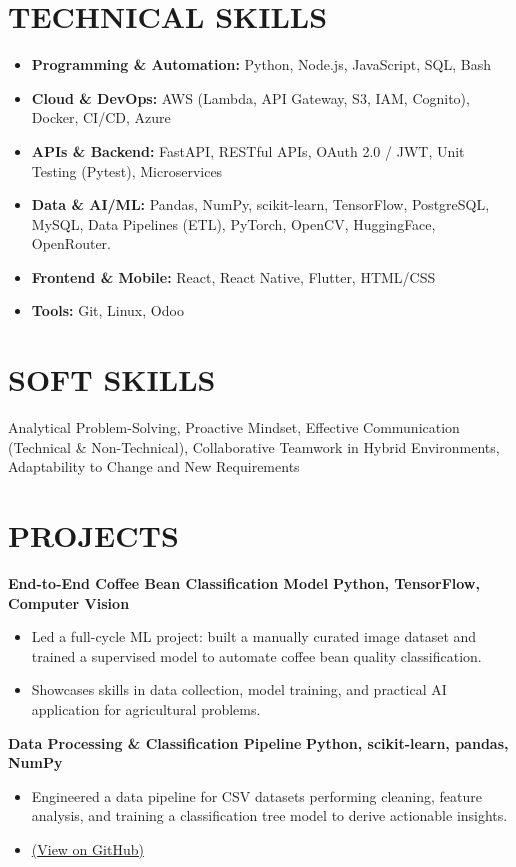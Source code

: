 \documentclass[11pt, a4paper]{article}
\begin{document}
\section*{TECHNICAL SKILLS}
\begin{itemize}[nosep, leftmargin=*]
	\item \textbf{Programming \& Automation:} Python, Node.js, JavaScript, SQL, Bash
	\item \textbf{Cloud \& DevOps:} AWS (Lambda, API Gateway, S3, IAM, Cognito), Docker, CI/CD, Azure
	\item \textbf{APIs \& Backend:} FastAPI, RESTful APIs, OAuth 2.0 / JWT, Unit Testing (Pytest), Microservices
	\item \textbf{Data \& AI/ML:} Pandas, NumPy, scikit-learn, TensorFlow, PostgreSQL, MySQL, Data Pipelines (ETL), PyTorch, OpenCV, HuggingFace, OpenRouter.
	\item \textbf{Frontend \& Mobile:} React, React Native, Flutter, HTML/CSS
	\item \textbf{Tools:} Git, Linux, Odoo
\end{itemize}

\section*{SOFT SKILLS}
Analytical Problem-Solving, Proactive Mindset, Effective Communication (Technical \& Non-Technical), Collaborative Teamwork in Hybrid Environments, Adaptability to Change and New Requirements

\section*{PROJECTS}

\textbf{End-to-End Coffee Bean Classification Model} \hfill \textbf{Python, TensorFlow, Computer Vision}
\begin{itemize}[leftmargin=*, nosep, topsep=4pt]
	\item Led a full-cycle ML project: built a manually curated image dataset and trained a supervised model to automate coffee bean quality classification.
	\item Showcases skills in data collection, model training, and practical AI application for agricultural problems.
\end{itemize}

\textbf{Data Processing \& Classification Pipeline} \hfill \textbf{Python, scikit-learn, pandas, NumPy}
\begin{itemize}[leftmargin=*, nosep, topsep=4pt]
	\item Engineered a data pipeline for CSV datasets performing cleaning, feature analysis, and training a classification tree model to derive actionable insights.
	\item \href{https://github.com/niczapata/Classification\_Tree\_UNIR}{(View on GitHub)}
\end{itemize}
\end{document}
